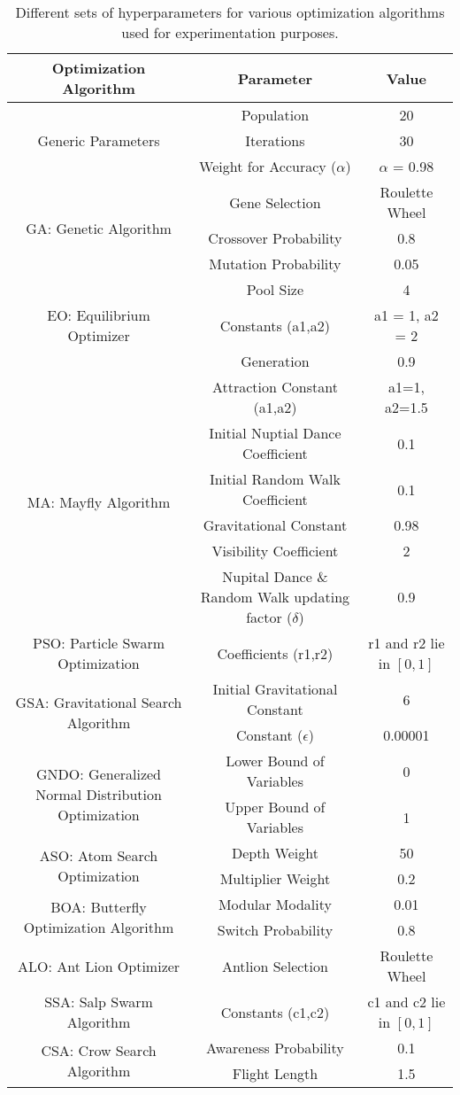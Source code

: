 \documentclass[final,3p,times]{elsarticle}
\begin{document}
\begin{table*}[ht!]
\caption{{Different sets of hyperparameters for various optimization algorithms used for experimentation purposes.}}
\centering
\begin{tabular}{c|cc}
\toprule
Optimization Algorithm & Parameter & Value\\
\midrule
    \multirow{3}{*}{Generic Parameters} & Population & 20\\
    & Iterations & 30\\
    & Weight for Accuracy ($\alpha$) & $\alpha$ = 0.98\\
    \midrule
    \multirow{3}{*}{GA: Genetic Algorithm} &  Gene Selection & Roulette Wheel\\
    & Crossover Probability & 0.8\\
    & Mutation Probability & 0.05\\
    \midrule
    \multirow{3}{*}{EO: Equilibrium Optimizer} & Pool Size & 4\\
    & Constants (a1,a2)& a1 = 1, a2 = 2\\
    & Generation & 0.9\\
    \midrule
    \multirow{6}{*}{MA: Mayfly Algorithm} & Attraction Constant (a1,a2) & a1=1, a2=1.5\\
    & Initial Nuptial Dance Coefficient & 0.1\\
    & Initial Random Walk Coefficient & 0.1\\
    & Gravitational Constant & 0.98\\
    & Visibility Coefficient & 2\\
    & Nupital Dance \& Random Walk updating factor ($\delta$) & 0.9\\
    \midrule
    PSO: Particle Swarm Optimization & Coefficients (r1,r2) & r1 and r2 lie in $[0,1]$\\
    \midrule
    \multirow{2}{*}{GSA: Gravitational Search Algorithm} & Initial Gravitational Constant & 6\\
    & Constant ($\epsilon$) & 0.00001\\
    \midrule
    \multirow{2}{*}{{\footnotesize GNDO: Generalized Normal Distribution Optimization}} & Lower Bound of Variables & 0\\
    & Upper Bound of Variables & 1\\
    \midrule
    \multirow{2}{*}{ASO: Atom Search Optimization} & Depth Weight & 50\\
    & Multiplier Weight & 0.2\\
    \midrule
    \multirow{2}{*}{BOA: Butterfly Optimization Algorithm} & Modular Modality & 0.01\\
    & Switch Probability & 0.8\\
    \midrule
    ALO: Ant Lion Optimizer & Antlion Selection & Roulette Wheel\\
    \midrule
    SSA: Salp Swarm Algorithm & Constants (c1,c2) & c1 and c2 lie in $[0,1]$\\
    \midrule
    \multirow{2}{*}{CSA: Crow Search Algorithm} & Awareness Probability & 0.1\\
    & Flight Length & 1.5\\
    \bottomrule
\end{tabular}
\label{tab:fspara}
\end{table*}
\end{document}
